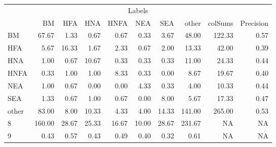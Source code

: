 \begin{table}
\centering\begingroup\fontsize{11}{13}\selectfont

\begin{tabular}{lrrrrrr>{}r|rr}
\toprule
\multicolumn{10}{c}{Labels} \\
\cmidrule(l{3pt}r{3pt}){1-10}
  & BM & HFA & HNA & HNFA & NEA & SEA & other & colSums & Precision\\
\midrule
BM & 67.67 & 1.33 & 0.67 & 0.67 & 0.33 & 3.67 & 48.00 & 122.33 & 0.57\\
HFA & 5.67 & 16.33 & 1.67 & 2.33 & 0.67 & 2.00 & 13.33 & 42.00 & 0.39\\
HNA & 1.00 & 0.67 & 10.67 & 0.33 & 0.33 & 0.33 & 11.00 & 24.33 & 0.44\\
HNFA & 0.33 & 1.00 & 1.00 & 8.33 & 0.33 & 0.00 & 8.67 & 19.67 & 0.40\\
NEA & 1.00 & 0.67 & 0.00 & 0.00 & 4.33 & 0.33 & 4.00 & 10.33 & 0.44\\
\addlinespace
SEA & 1.33 & 0.67 & 1.00 & 0.67 & 0.00 & 8.00 & 5.67 & 17.33 & 0.47\\
other & 83.00 & 8.00 & 10.33 & 4.33 & 4.00 & 14.33 & 141.00 & 265.00 & 0.53\\
8 & 160.00 & 28.67 & 25.33 & 16.67 & 10.00 & 28.67 & 231.67 & NA & NA\\
9 & 0.43 & 0.57 & 0.43 & 0.49 & 0.40 & 0.32 & 0.61 & NA & NA\\
\bottomrule
\end{tabular}
\endgroup{}
\end{table}
